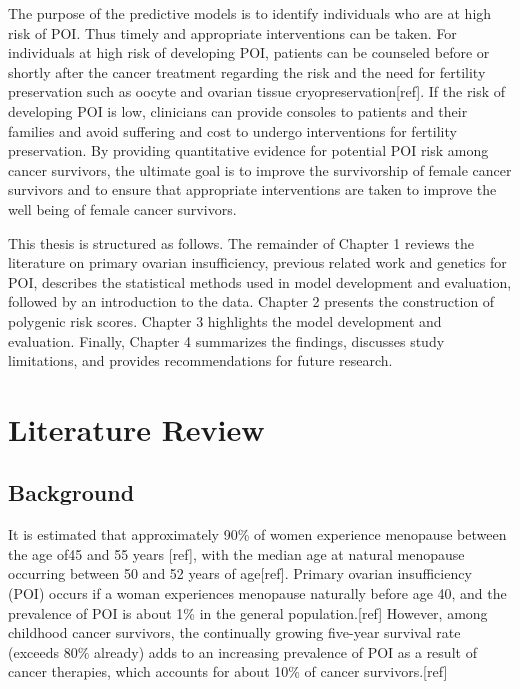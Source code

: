 \documentclass[
]{book}
\begin{document}
The purpose of the predictive models is to identify individuals who are at high risk of POI. Thus timely and appropriate interventions can be taken. For individuals at high risk of developing POI, patients can be counseled before or shortly after the cancer treatment regarding the risk and the need for fertility preservation such as oocyte and ovarian tissue cryopreservation{[}ref{]}. If the risk of developing POI is low, clinicians can provide consoles to patients and their families and avoid suffering and cost to undergo interventions for fertility preservation. By providing quantitative evidence for potential POI risk among cancer survivors, the ultimate goal is to improve the survivorship of female cancer survivors and to ensure that appropriate interventions are taken to improve the well being of female cancer survivors.

This thesis is structured as follows. The remainder of Chapter 1 reviews the literature on primary ovarian insufficiency, previous related work and genetics for POI, describes the statistical methods used in model development and evaluation, followed by an introduction to the data. Chapter 2 presents the construction of polygenic risk scores. Chapter 3 highlights the model development and evaluation. Finally, Chapter 4 summarizes the findings, discusses study limitations, and provides recommendations for future research.

\hypertarget{Lit}{%
\chapter{Literature Review}\label{Lit}}

\hypertarget{background01}{%
\section{Background}\label{background01}}

It is estimated that approximately 90\% of women experience menopause between the age of45 and 55 years {[}ref{]}, with the median age at natural menopause occurring between 50 and 52 years of age{[}ref{]}. Primary ovarian insufficiency (POI) occurs if a woman experiences menopause naturally before age 40, and the prevalence of POI is about 1\% in the general population.{[}ref{]}
However, among childhood cancer survivors, the continually growing five-year survival rate (exceeds 80\% already) adds to an increasing prevalence of POI as a result of cancer therapies, which accounts for about 10\% of cancer survivors.{[}ref{]}
\end{document}
